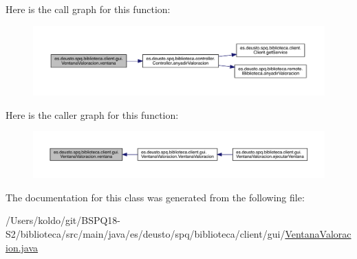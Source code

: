 Here is the call graph for this function\+:
\nopagebreak
\begin{figure}[H]
\begin{center}
\leavevmode
\includegraphics[width=350pt]{classes_1_1deusto_1_1spq_1_1biblioteca_1_1client_1_1gui_1_1_ventana_valoracion_ae8f27fb158d5eb96f275b805f40446e1_cgraph}
\end{center}
\end{figure}
Here is the caller graph for this function\+:
\nopagebreak
\begin{figure}[H]
\begin{center}
\leavevmode
\includegraphics[width=350pt]{classes_1_1deusto_1_1spq_1_1biblioteca_1_1client_1_1gui_1_1_ventana_valoracion_ae8f27fb158d5eb96f275b805f40446e1_icgraph}
\end{center}
\end{figure}


The documentation for this class was generated from the following file\+:\begin{DoxyCompactItemize}
\item 
/\+Users/koldo/git/\+B\+S\+P\+Q18-\/\+S2/biblioteca/src/main/java/es/deusto/spq/biblioteca/client/gui/\mbox{\hyperlink{_ventana_valoracion_8java}{Ventana\+Valoracion.\+java}}\end{DoxyCompactItemize}
